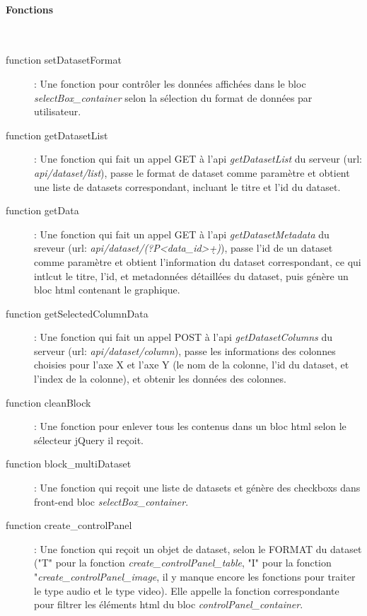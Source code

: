 \documentclass[a4paper]{report}
\begin{document}
\paragraph{Fonctions}~\\
\begin{description}
	\item[function setDatasetFormat]: Une fonction pour contrôler les données affichées dans le bloc \emph{selectBox\_container} selon la sélection du format de données par utilisateur.
	
	\item[function getDatasetList]: Une fonction qui fait un appel GET à l'api \emph{getDatasetList} du serveur (url: \emph{api/dataset/list}), passe le format de dataset comme paramètre et obtient une liste de datasets correspondant, incluant le titre et l'id du dataset.
	
	\item[function getData]: Une fonction qui fait un appel GET à l'api \emph{getDatasetMetadata} du sreveur (url: \emph{api/dataset/(?P<data\_id>\d+)}), passe l'id de un dataset comme paramètre et obtient l'information du dataset correspondant, ce qui intlcut le titre, l'id, et metadonnées détaillées du dataset, puis génère un bloc html contenant le graphique.
	
	\item[function getSelectedColumnData]: Une fonction qui fait un appel POST à l'api \emph{getDatasetColumns} du serveur (url: \emph{api/dataset/column}), passe les informations des colonnes choisies pour l'axe X et l'axe Y (le nom de la colonne, l'id du dataset, et l'index de la colonne), et obtenir les données des colonnes.
	
	\item[function cleanBlock]: Une fonction pour enlever tous les contenus dans un bloc html selon le sélecteur jQuery il reçoit.
	
	\item[function block\_multiDataset]: Une fonction qui reçoit une liste de datasets et génère des checkboxs dans front-end bloc \emph{selectBox\_container}.
	
	\item[function create\_controlPanel]: Une fonction qui reçoit un objet de dataset, selon le FORMAT du dataset ("T" pour la fonction \emph{create\_controlPanel\_table}, "I" pour la fonction "\emph{create\_controlPanel\_image}, il y manque encore les fonctions pour traiter le type audio et le type video). Elle appelle la fonction correspondante pour filtrer les éléments html du bloc \emph{controlPanel\_container}.
	

\end{description}
\end{document}
